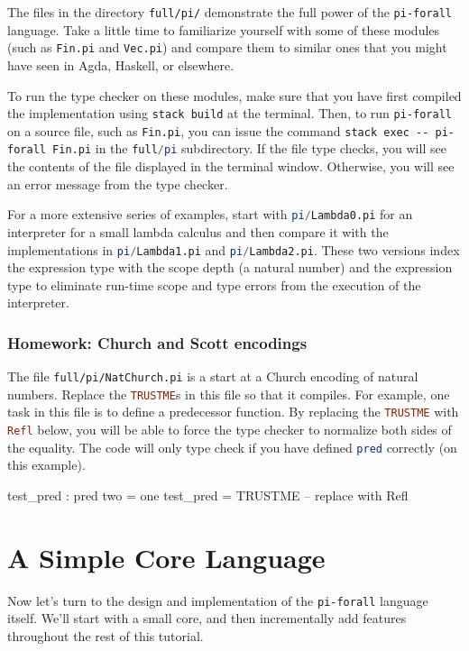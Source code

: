 \documentclass{article}
\newcommand\cd[1]{\lstinline[language=Haskell]{#1}}
\newcommand\pif{\texttt{pi-forall}\xspace}
\theoremstyle{definition}
\begin{document}
The files in the directory \texttt{full/pi/} demonstrate the full power of the
\pif language. Take a little time to familiarize yourself with some of these
modules (such as \cd{Fin.pi} and \cd{Vec.pi}) and compare them to similar
ones that you might have seen in Agda, Haskell, or elsewhere.

To run the type checker on these modules, make sure that you have first
compiled the implementation using \texttt{stack build} at the terminal.  Then,
to run \pif on a source file, such as \cd{Fin.pi}, you can issue the command
\texttt{stack exec -{}- pi-forall Fin.pi} in the \cd{full/pi} subdirectory. If
the file type checks, you will see the contents of the file displayed in the
terminal window. Otherwise, you will see an error message from the type checker.

For a more extensive series of examples, start with \cd{pi/Lambda0.pi} for an
interpreter for a small lambda calculus and then compare it with the
implementations in \cd{pi/Lambda1.pi} and \cd{pi/Lambda2.pi}. These two
versions index the expression type with the scope depth (a natural number) and
the expression type to eliminate run-time scope and type errors from the
execution of the interpreter.

\subsubsection{Homework: Church and Scott  encodings}

The file \texttt{full/pi/NatChurch.pi} is a start at a Church encoding of
natural numbers. Replace the \cd{TRUSTME}s in this file so that it
compiles. For example, one task in this file is to define a predecessor
function. By replacing the \cd{TRUSTME} with \cd{Refl} below, you will be able
to force the type checker to normalize both sides of the equality. The code
will only type check if you have defined \cd{pred} correctly (on this
example).

\begin{piforall}
test_pred : pred two = one
test_pred = TRUSTME -- replace with Refl
\end{piforall}

\section{A Simple Core Language}
\label{sec:simple}

Now let's turn to the design and implementation of the \pif language
itself. We'll start with a small core, and then incrementally add features
throughout the rest of this tutorial.
\end{document}
